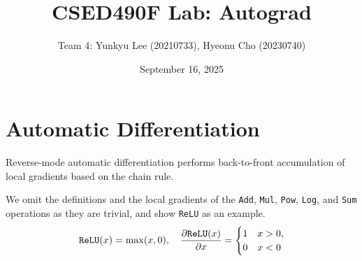 \documentclass{lucas-report}
\title{CSED490F Lab: Autograd}
\author{Team 4: Yunkyu Lee (20210733), Hyeonu Cho (20230740)}
\date{September 16, 2025}
\begin{document}
\maketitle

\section{Automatic Differentiation}\label{sec:autodiff}

Reverse-mode automatic differentiation performs
back-to-front accumulation of local gradients based on the chain rule.


We omit the definitions and the local gradients of the
\texttt{Add}, \texttt{Mul}, \texttt{Pow}, \texttt{Log}, and \texttt{Sum} operations as they are trivial,
and show \texttt{ReLU} as an example.
\[
  \texttt{ReLU}(x) = \max(x, 0),
  \quad \pdv{\texttt{ReLU}(x)}{x} =
  \begin{cases}
    1 & x > 0, \\
    0 & x < 0
  \end{cases}
\]
\end{document}
